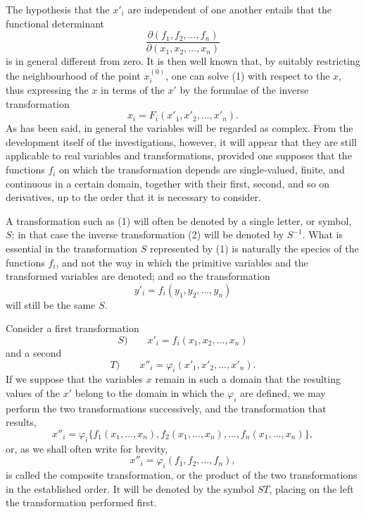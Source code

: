 \documentclass[11pt]{book}
\begin{document}
The hypothesis that the $x'_i$ are independent of one another entails that the functional determinant
\[
 \frac{\partial(f_1,f_2,\ldots,f_n)}{\partial(x_1,x_2,\ldots,x_n)}
\]
is in general different from zero. It is then well known that, by suitably restricting the neighbourhood of the point $x_i^{(0)}$, one can solve (1) with respect to the $x$, thus expressing the $x$ in terms of the $x'$ by the formulae of the inverse transformation
\begin{equation*}\tag{2}
 x_i=F_i(x'_1,x'_2,\ldots,x'_n).
\end{equation*}
As has been said, in general the variables will be regarded as complex. From the development itself of the investigations, however, it will appear that they are still applicable to real variables and transformations, provided one supposes that the functions $f_i$ on which the transformation depends are single-valued, finite, and continuous in a certain domain, together with their first, second, and so on derivatives, up to the order that it is necessary to consider.

A transformation such as (1) will often be denoted by a single letter, or symbol, $S$; in that case the inverse transformation (2) will be denoted by $S^{-1}$. What is essential in the transformation $S$ represented by (1) is naturally the species of the functions $f_i$, and not the way in which the primitive variables and the transformed variables are denoted; and so the transformation
\[
 y'_i=f_i(y_1,y_2,\ldots,y_n)
\]
will still be the same $S$.

Consider a first transformation
\[
 S)\qquad x'_i=f_i(x_1,x_2,\ldots,x_n)
\]
and a second
\[
 T)\qquad x''_i=\varphi_i(x'_1,x'_2,\ldots,x'_n).
\]
If we suppose that the variables $x$ remain in such a domain that the resulting values of the $x'$ belong to the domain in which the $\varphi_i$ are defined, we may perform the two transformations successively, and the transformation that results,
\[
 x''_i=\varphi_i\{f_1(x_1,\ldots,x_n),f_2(x_1,\ldots,x_n),\ldots,f_n(x_1,\ldots,x_n)\},
\]
or, as we shall often write for brevity,
\[
 x''_i=\varphi_i(f_1,f_2,\ldots,f_n),
\]
is called the composite transformation, or the product of the two transformations in the established order. It will be denoted by the symbol $ST$, placing on the left the transformation performed first.
\end{document}
